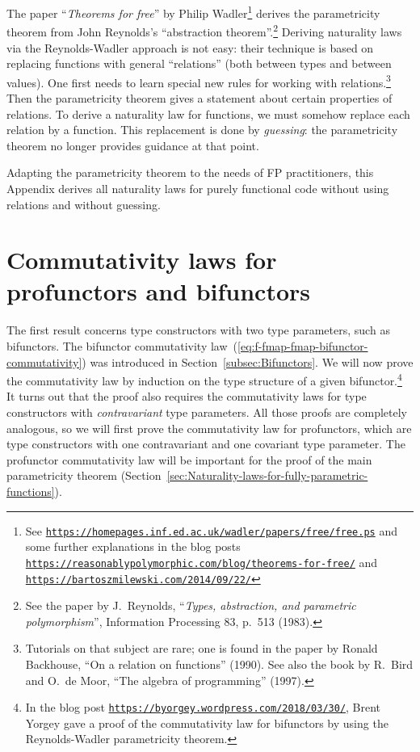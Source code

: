 \noindent {}The paper \textsf{``}\emph{Theorems for free}\textsf{''}
by Philip Wadler\footnote{See \texttt{\href{https://homepages.inf.ed.ac.uk/wadler/papers/free/free.ps}{https://homepages.inf.ed.ac.uk/wadler/papers/free/free.ps}}
and some further explanations in the blog posts \texttt{\href{https://reasonablypolymorphic.com/blog/theorems-for-free/}{https://reasonablypolymorphic.com/blog/theorems-for-free/}}
and \texttt{\href{https://bartoszmilewski.com/2014/09/22/}{https://bartoszmilewski.com/2014/09/22/}}} derives the parametricity theorem from John Reynolds's \textsf{``}abstraction
theorem\textsf{''}.\footnote{See the paper by J.~Reynolds, \textsf{``}\emph{Types, abstraction, and parametric
polymorphism}\textsf{''}, Information Processing 83, p.~513 (1983).} Deriving naturality laws via the Reynolds-Wadler approach is not
easy: their technique is based on replacing functions with general
\textsf{``}relations\textsf{''} (both between types and between values). One first
needs to learn special new rules for working with relations.\footnote{Tutorials on that subject are rare; one is found in the paper by Ronald
Backhouse, \textsf{``}On a relation on functions\textsf{''} (1990). See also the book
by R.~Bird and O.~de Moor, \textsf{``}The algebra of programming\textsf{''} (1997).} Then the parametricity theorem gives a statement about certain properties
of relations. To derive a naturality law for functions, we must somehow
replace each relation by a function. This replacement is done by \emph{guessing}:
the parametricity theorem no longer provides guidance at that point.

Adapting the parametricity theorem to the needs of FP practitioners,
this Appendix derives all naturality laws for purely functional code
without using relations and without guessing.

\section{Commutativity laws for profunctors and bifunctors\label{sec:Commutativity-laws-for-type-constructors}}

The first result concerns type constructors with two type parameters,
such as bifunctors. The bifunctor commutativity law~(\ref{eq:f-fmap-fmap-bifunctor-commutativity})
was introduced in Section~\ref{subsec:Bifunctors}. We will now prove
the commutativity law by induction on the type structure of a given
bifunctor.\footnote{In the blog post \texttt{\href{https://byorgey.wordpress.com/2018/03/30/}{https://byorgey.wordpress.com/2018/03/30/}},
Brent Yorgey gave a proof of the commutativity
law for bifunctors by using the Reynolds-Wadler parametricity
theorem. } It turns out that the proof also requires the commutativity laws
for type constructors with \emph{contravariant} type parameters. All
those proofs are completely analogous, so we will first prove the
commutativity law for profunctors, which are type constructors with
one contravariant and one covariant type parameter. The profunctor
commutativity law will be important for the proof of the main parametricity
theorem (Section~\ref{sec:Naturality-laws-for-fully-parametric-functions}). 

